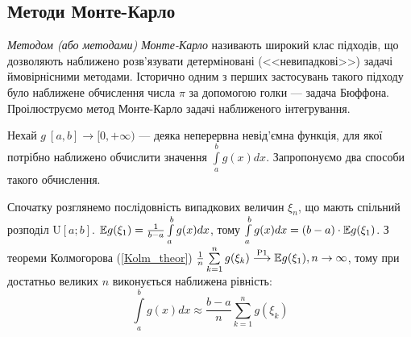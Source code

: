 \subsection{Методи Монте-Карло}
\emph{Методом (або методами) Монте-Карло} називають широкий клас підходів, що дозволяють наближено розв'язувати детерміновані (<<невипадкові>>) задачі ймовірнісними методами. 
Історично одним з перших застосувань такого підходу було наближене обчислення числа $\pi$ за допомогою голки --- задача Бюффона. Проілюструємо метод Монте-Карло задачі наближеного інтегрування.

Нехай $g\:[a,b]\to[0,+\infty)$ --- деяка неперервна невід'ємна функція, для якої потрібно наближено обчислити значення $\int\limits_a^b g(x) dx$. Запропонуємо два способи такого обчислення.

Спочатку розглянемо послідовність випадкових величин $\xi_n$, що мають спільний розподіл $\mathrm{U}[a; b]$.
$\mathbb{E} g(\xi_1) = \frac{1}{b-a} \int\limits_a^b g(x) dx$, тому $\int\limits_a^b g(x) dx = (b-a)\cdot \mathbb{E} g(\xi_1)$. З теореми Колмогорова (\ref{Kolm_theor})
$\frac{1}{n}\sum\limits_{k=1}^n g(\xi_k) \overset{\mathrm{P1}}{\longrightarrow} \mathbb{E} g(\xi_1), n\to\infty$, тому при достатньо великих $n$ виконується наближена рівність:
$$\int\limits_a^b g(x) dx\approx\frac{b-a}{n}\sum\limits_{k=1}^ng(\xi_k)$$

